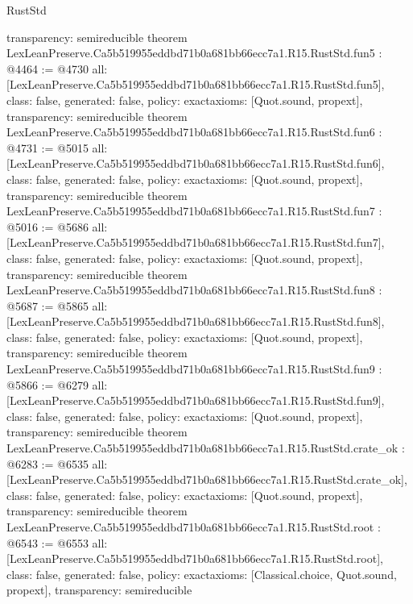 \begin{lexlean}{RustStd}
\begin{coremodule}
{  transparency: semireducible
}
theorem LexLeanPreserve.Ca5b519955eddbd71b0a681bb66ecc7a1.R15.RustStd.fun5 : @4464 := @4730 {
  all: [LexLeanPreserve.Ca5b519955eddbd71b0a681bb66ecc7a1.R15.RustStd.fun5],
  class: false,
  generated: false,
  policy: exact{axioms: [Quot.sound, propext]},
  transparency: semireducible
}
theorem LexLeanPreserve.Ca5b519955eddbd71b0a681bb66ecc7a1.R15.RustStd.fun6 : @4731 := @5015 {
  all: [LexLeanPreserve.Ca5b519955eddbd71b0a681bb66ecc7a1.R15.RustStd.fun6],
  class: false,
  generated: false,
  policy: exact{axioms: [Quot.sound, propext]},
  transparency: semireducible
}
theorem LexLeanPreserve.Ca5b519955eddbd71b0a681bb66ecc7a1.R15.RustStd.fun7 : @5016 := @5686 {
  all: [LexLeanPreserve.Ca5b519955eddbd71b0a681bb66ecc7a1.R15.RustStd.fun7],
  class: false,
  generated: false,
  policy: exact{axioms: [Quot.sound, propext]},
  transparency: semireducible
}
theorem LexLeanPreserve.Ca5b519955eddbd71b0a681bb66ecc7a1.R15.RustStd.fun8 : @5687 := @5865 {
  all: [LexLeanPreserve.Ca5b519955eddbd71b0a681bb66ecc7a1.R15.RustStd.fun8],
  class: false,
  generated: false,
  policy: exact{axioms: [Quot.sound, propext]},
  transparency: semireducible
}
theorem LexLeanPreserve.Ca5b519955eddbd71b0a681bb66ecc7a1.R15.RustStd.fun9 : @5866 := @6279 {
  all: [LexLeanPreserve.Ca5b519955eddbd71b0a681bb66ecc7a1.R15.RustStd.fun9],
  class: false,
  generated: false,
  policy: exact{axioms: [Quot.sound, propext]},
  transparency: semireducible
}
theorem LexLeanPreserve.Ca5b519955eddbd71b0a681bb66ecc7a1.R15.RustStd.crate_ok : @6283 := @6535 {
  all: [LexLeanPreserve.Ca5b519955eddbd71b0a681bb66ecc7a1.R15.RustStd.crate_ok],
  class: false,
  generated: false,
  policy: exact{axioms: [Quot.sound, propext]},
  transparency: semireducible
}
theorem LexLeanPreserve.Ca5b519955eddbd71b0a681bb66ecc7a1.R15.RustStd.root : @6543 := @6553 {
  all: [LexLeanPreserve.Ca5b519955eddbd71b0a681bb66ecc7a1.R15.RustStd.root],
  class: false,
  generated: false,
  policy: exact{axioms: [Classical.choice, Quot.sound, propext]},
  transparency: semireducible
}


\end{coremodule}
\end{lexlean}
